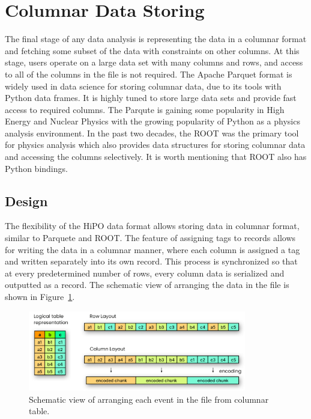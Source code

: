 \section{Columnar Data Storing}

The final stage of any data analysis is representing the data in a columnar format and fetching some subset of the data with constraints 
on other columns. At this stage, users operate on a large data set with many columns and rows, and access to all of the 
columns in the file is not required. The Apache Parquet format is widely used in data science for storing columnar data, due to its tools
with Python data frames. It is highly tuned to store large data sets and provide fast access to required columns. The Parqute is gaining
some popularity in High Energy and Nuclear Physics with the growing popularity of Python as a physics analysis environment. In the
past two decades, the ROOT was the primary tool for physics analysis which also provides data structures for storing columnar data 
and accessing the columns selectively. It is worth mentioning that ROOT also has Python bindings. 

\subsection{Design}

The flexibility of the HiPO data format allows storing data in columnar format, similar to Parquete and ROOT. 
The feature of assigning tags to records allows for writing the data in a columnar manner, where each column is assigned a tag and written separately into its own record.
This process is synchronized so that at every predetermined number of rows, every column data is serialized and outputted as a record. The schematic view of arranging 
the data in the file is shown in Figure~\ref{fig:tuple_schema}.

\begin{figure}[h!]
  \begin{center}
    \includegraphics[width=0.85\textwidth]{images/tuple_schema.png}
 \end{center}
  \caption{Schematic view of arranging each event in the file from columnar table.}
 \label{fig:tuple_schema}
\end{figure}

